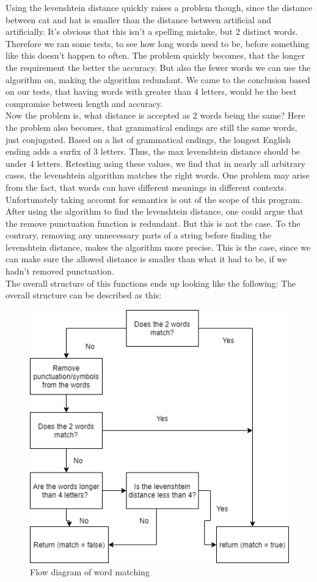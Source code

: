 Using the levenshtein distance quickly raises a problem though, since the distance between cat and hat is smaller than the distance
between artificial and artificially. 
It's obvious that this isn't a spelling mistake, but 2 distinct words. Therefore we ran
some tests, to see how long words need to be, before something like this doesn't happen to often. 
The problem quickly becomes, that the longer the requirement the better the accuracy. 
But also the fewer words we can use the algorithm on, making the algorithm redundant.
We came to the conclusion based on our tests, that having words with greater than 4 letters, would be
the best compromise between length and accuracy.
\\
Now the problem is, what distance is accepted as 2 words being the same?
Here the problem also becomes, that grammatical endings are still the same words, just conjugated.
Based on a list of grammatical endings, the longest English ending adds a surfix of 3 letters\cite{grammar_endings}. Thus,
the max levenshtein distance should be under 4 letters.
Retesting using these values, we find that in nearly all arbitrary cases, the levenshtein algorithm matches the right words.
One problem may arise from the fact, that words can have different meanings in different contexts. Unfortunately taking account for semantics is out of the scope of this program.
\\
After using the algorithm to find the levenshtein distance, one could argue that the remove punctuation function is redundant. But this is not the case. To the contrary, removing any
unnecessary parts of a string before finding the levenshtein distance, makes the algorithm more precise. This is the case, since we can make sure the allowed distance
is smaller than what it had to be, if we hadn't removed punctuation.
\\
The overall structure of this functions ends up looking like the following: %
\newpage
The overall structure can be described as this:
\begin{figure}[H]
  \centering
  \includegraphics[scale = 0.6]{figures/is_match}
  \caption{Flow diagram of word matching}\label{fig:ie}
\end{figure}


